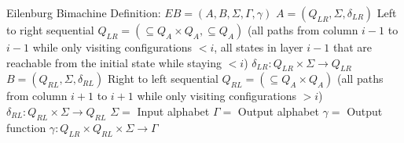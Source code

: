 \documentclass[12pt, a4paper]{article}
\begin{document}



\pagebreak
\begin{algorithmic}
    \STATE Eilenburg Bimachine Definition:
    \STATE $EB = (A, B, \Sigma, \Gamma, \gamma)$
    \STATE $A = (Q_{LR}, \Sigma, \delta_{LR})$ Left to right sequential
    \STATE $Q_{LR} = (\subseteq Q_A \times Q_A, \subseteq Q_A)$ (all paths from column $i-1$ to $i-1$ while only visiting configurations $< i$, all states in layer $i-1$ that are reachable from the initial state while staying $< i$)
    \STATE $\delta_{LR}: Q_{LR} \times \Sigma \to Q_{LR}$
    \STATE $B = (Q_{RL}, \Sigma, \delta_{RL})$ Right to left sequential
    \STATE $Q_{RL} = (\subseteq Q_A \times Q_A)$ (all paths from column $i+1$ to $i + 1$ while only visiting configurations $> i$)
    \STATE $\delta_{RL}: Q_{RL} \times \Sigma \to Q_{RL}$
    \STATE $\Sigma = $ Input alphabet
    \STATE $ \Gamma = $ Output alphabet
    \STATE $\gamma = $ Output function
    \STATE $\gamma: Q_{LR} \times Q_{RL} \times \Sigma \to \Gamma$
\end{algorithmic}
\end{document}
